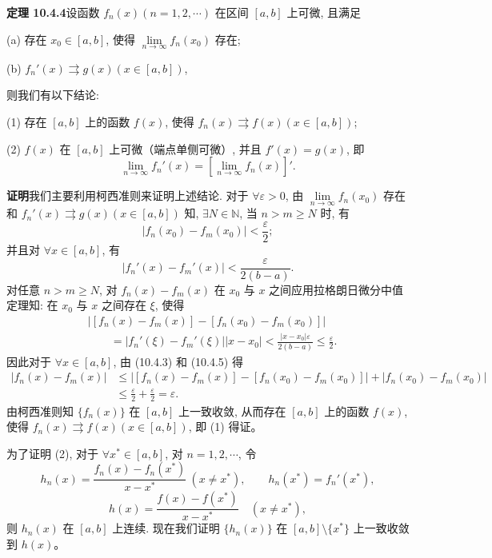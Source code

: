 \documentclass[UTF8,12pt,a4paper,fontset=fandol]{ctexart}
\begin{document}
\noindent\textbf{定理 10.4.4}\quad 设函数 $f_n(x)(n=1,2,\cdots)$ 在区间 $[a,b]$ 上可微, 且满足

(a) 存在 $x_0\in[a,b]$, 使得 $\lim\limits_{n\to\infty}f_n(x_0)$ 存在;

(b) $f_n'(x)\rightrightarrows g(x)(x\in[a,b])$,

则我们有以下结论:

(1) 存在 $[a,b]$ 上的函数 $f(x)$, 使得 $f_n(x)\rightrightarrows f(x)(x\in[a,b])$;

(2) $f(x)$ 在 $[a,b]$ 上可微（端点单侧可微）, 并且 $f'(x)=g(x)$, 即
\[
  \lim_{n\to\infty}f_n'(x)=\left[\lim_{n\to\infty}f_n(x)\right]'.
\]

\noindent\textbf{证明}\quad 我们主要利用柯西准则来证明上述结论. 对于 $\forall\varepsilon>0$, 由 $\lim\limits_{n\to\infty}f_n(x_0)$ 存在和 $f_n'(x)\rightrightarrows g(x)(x\in[a,b])$ 知, $\exists N\in\mathbb N$, 当 $n>m\geq N$ 时, 有
\begin{equation}
  |f_n(x_0)-f_m(x_0)|<\frac\varepsilon2;
  \tag{10.4.3}
\end{equation}
并且对 $\forall x\in[a,b]$, 有
\begin{equation}
  |f_n'(x)-f_m'(x)|<\frac{\varepsilon}{2(b-a)}.
  \tag{10.4.4}
\end{equation}
对任意 $n>m\geq N$, 对 $f_n(x)-f_m(x)$ 在 $x_0$ 与 $x$ 之间应用拉格朗日微分中值定理知: 在 $x_0$ 与 $x$ 之间存在 $\xi$, 使得
\begin{equation}
\begin{aligned}
  &\left|[f_n(x)-f_m(x)]-[f_n(x_0)-f_m(x_0)]\right|\\
  &\qquad =|f_n'(\xi)-f_m'(\xi)||x-x_0|
   <\frac{|x-x_0|\varepsilon}{2(b-a)}\leq\frac\varepsilon2.
\end{aligned}
  \tag{10.4.5}
\end{equation}
因此对于 $\forall x\in[a,b]$, 由 (10.4.3) 和 (10.4.5) 得
\[
\begin{aligned}
  |f_n(x)-f_m(x)|
  &\leq \left|[f_n(x)-f_m(x)]-[f_n(x_0)-f_m(x_0)]\right|
      +|f_n(x_0)-f_m(x_0)|\\
  &\leq\frac\varepsilon2+\frac\varepsilon2=\varepsilon.
\end{aligned}
\]
由柯西准则知 $\{f_n(x)\}$ 在 $[a,b]$ 上一致收敛, 从而存在 $[a,b]$ 上的函数 $f(x)$, 使得 $f_n(x)\rightrightarrows f(x)(x\in[a,b])$, 即 (1) 得证。

为了证明 (2), 对于 $\forall x^*\in[a,b]$, 对 $n=1,2,\cdots$, 令
\[
  h_n(x)=\frac{f_n(x)-f_n(x^*)}{x-x^*}\ (x\ne x^*),\qquad h_n(x^*)=f_n'(x^*),
\]
\[
  h(x)=\frac{f(x)-f(x^*)}{x-x^*}\quad (x\ne x^*),
\]
则 $h_n(x)$ 在 $[a,b]$ 上连续. 现在我们证明 $\{h_n(x)\}$ 在 $[a,b]\setminus\{x^*\}$ 上一致收敛到 $h(x)$。
\end{document}
